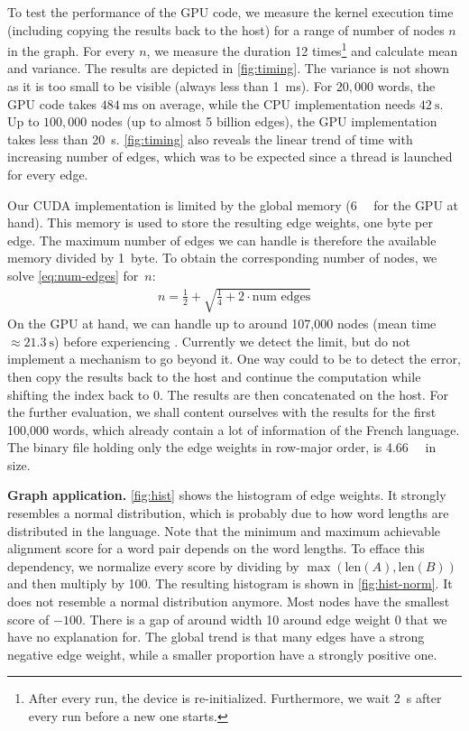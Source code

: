 \vspace{-1.5em}

To test the performance of the GPU code, we measure the kernel execution time (including copying the results back to the host) for a range of number of nodes $n$ in the graph. For every $n$, we measure the duration 12 times\footnote{After every run, the device is re-initialized. Furthermore, we wait \qty{2}{\s} after every run before a new one starts.} and calculate mean and variance. The results are depicted in \autoref{fig:timing}. The variance is not shown as it is too small to be visible (always less than \qty{1}{\ms}). For $20,000$ words, the GPU code takes $\qty{484}{\ms}$ on average, while the CPU implementation needs $\qty{42}{\s}$. Up to $100,000$ nodes (\ie up to almost 5 billion edges), the GPU implementation takes less than \qty{20}{\s}. \autoref{fig:timing} also reveals the linear trend of time with increasing number of edges, which was to be expected since a thread is launched for every edge.

Our CUDA implementation is limited by the global memory (\qty{6}{\giga\byte} for the GPU at hand). This memory is used to store the resulting edge weights, \ie one byte per edge. The maximum number of edges we can handle is therefore the available memory divided by 1~byte. To obtain the corresponding number of nodes, we solve \eqref{eq:num-edges} for~$n$:
\begin{align}
    n = \frac{1}{2} + \sqrt{\frac{1}{4} + 2 \cdot \text{num edges}}
\end{align}
On the GPU at hand, we can handle up to around 107,000 nodes (mean time $\approx \qty{21.3}{\s}$) before experiencing . Currently we detect the limit, but do not implement a mechanism to go beyond it. One way could to be to detect the error, then copy the results back to the host and continue the computation while shifting the index back to $0$. The results are then concatenated on the host. For the further evaluation, we shall content ourselves with the results for the first 100,000 words, which already contain a lot of information of the French language. The binary file holding only the edge weights in row-major order, is \qty{4.66}{\giga\byte} in size.

\textbf{Graph application.} \autoref{fig:hist} shows the histogram of edge weights. It strongly resembles a normal distribution, which is probably due to how word lengths are distributed in the language. Note that the minimum and maximum achievable alignment score for a word pair depends on the word lengths. To efface this dependency, we normalize every score by dividing by $\max(\text{len}(A), \text{len}(B))$ and then multiply by 100. The resulting histogram is shown in \autoref{fig:hist-norm}. It does not resemble a normal distribution anymore. Most nodes have the smallest score of $-100$. There is a gap of around width 10 around edge weight 0 that we have no explanation for. The global trend is that many edges have a strong negative edge weight, while a smaller proportion have a strongly positive one.

